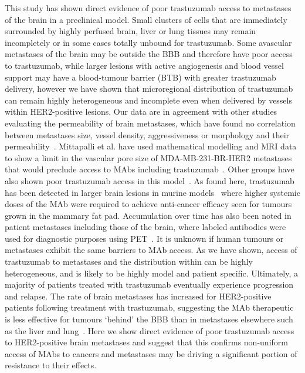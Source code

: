 This study has shown direct evidence of poor trastuzumab access to metastases of the brain in a preclinical model.
Small clusters of cells that are immediately surrounded by highly perfused brain, liver or lung tissues may remain incompletely or in some cases totally unbound for trastuzumab.
Some avascular metastases of the brain may be outside the \acs{BBB} and therefore have poor access to trastuzumab, while larger lesions with active angiogenesis and blood vessel support may have a blood-tumour barrier (BTB) with greater trastuzumab delivery, however we have shown that microregional distribution of trastuzumab can remain highly heterogeneous and incomplete even when delivered by vessels within \acs{HER2}-positive lesions.
Our data are in agreement with other studies evaluating the permeability of brain metastases, which have found no correlation between metastases size, vessel density, aggressiveness or morphology and their permeability~\cite{Murrell:2015bz,Adkins:2016il}.
Mittapalli et al. have used mathematical modelling and MRI data to show a limit in the vascular pore size of MDA-MB-231-BR-\acs{HER2} metastases that would preclude access to \acs{MAb}s including trastuzumab~\cite{Mittapalli:2017iu}.
Other groups have also shown poor trastuzumab access in this model~\cite{Nounou:2016kl,TerrellHall:2017gu}.
As found here, trastuzumab has been detected in larger brain lesions in murine models~\cite{LewisPhillips:2017jj} where higher systemic doses of the \acs{MAb} were required to achieve anti-cancer efficacy seen for tumours grown in the mammary fat pad.
Accumulation over time has also been noted in patient metastases including those of the brain, where labeled antibodies were used for diagnostic purposes using PET~\cite{Dijkers:2010gc,Kurihara:2015kc}.
It is unknown if human tumours or metastases exhibit the same barriers to \acs{MAb} access.
As we have shown, access of trastuzumab to metastases and the distribution within can be highly heterogeneous, and is likely to be highly model and patient specific.
Ultimately, a majority of patients treated with trastuzumab eventually experience progression and relapse.
The rate of brain metastases has increased for \acs{HER2}-positive patients following treatment with trastuzumab, suggesting the \acs{MAb} therapeutic is less effective for tumours `behind' the \acs{BBB} than in metastases elsewhere such as the liver and lung~\cite{Stemmler:2006}.
Here we show direct evidence of poor trastuzumab access to \acs{HER2}-positive brain metastases and suggest that this confirms non-uniform access of \acs{MAb}s to cancers and metastases may be driving a significant portion of resistance to their effects.

